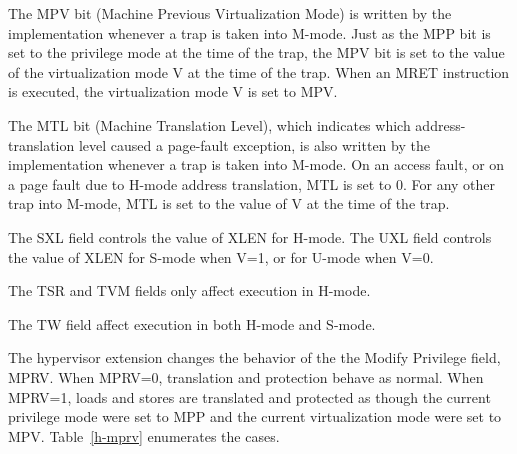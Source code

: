 The MPV bit (Machine Previous Virtualization Mode) is written by the implementation
whenever a trap is taken into M-mode.  Just as the MPP bit is set to the privilege
mode at the time of the trap, the MPV bit is set to the value of the virtualization
mode V at the time of the trap.  When an MRET instruction is executed, the
virtualization mode V is set to MPV.

The MTL bit (Machine Translation Level), which indicates which address-translation level
caused a page-fault exception, is also written by the implementation whenever a trap
is taken into M-mode.  On an access fault, or on a page fault due to H-mode address
translation, MTL is set to 0.  For any other trap into M-mode, MTL is set to the value
of V at the time of the trap.

The SXL field controls the value of XLEN for H-mode.
The UXL field controls the value of XLEN for S-mode when V=1, or for U-mode when V=0.

The TSR and TVM fields only affect execution in H-mode.

The TW field affect execution in both H-mode and S-mode.

The hypervisor extension changes the behavior of the the Modify Privilege
field, MPRV.  When MPRV=0, translation and protection behave as normal.  When
MPRV=1, loads and stores are translated and protected as though the current
privilege mode were set to MPP and the current virtualization mode were set to
MPV.  Table~\ref{h-mprv} enumerates the cases.

